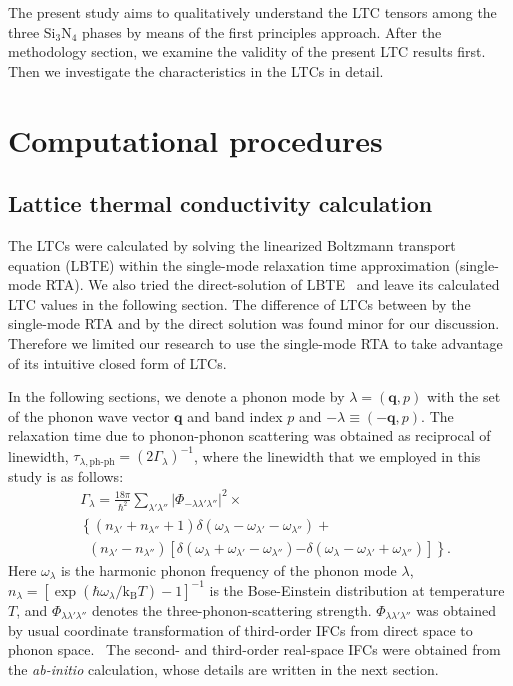 \documentclass[twocolumn,amsmath,amssymb,a4paper,prb,superscriptaddress,floatfix]{revtex4-1}
\begin{document}
The present study aims to qualitatively understand the LTC tensors among the
three Si$_3$N$_4$ phases by means of the first principles approach.  After the
methodology section, we examine the validity of the present LTC results first.
Then we investigate the characteristics in the LTCs in detail.

\section{Computational procedures}

\subsection{Lattice thermal conductivity calculation}

The LTCs were calculated by solving the linearized Boltzmann transport equation
(LBTE) within the single-mode relaxation time approximation (single-mode RTA).
We also tried the direct-solution of LBTE~\cite{chaput-direct} and
leave its calculated LTC values in the following section. The
difference of LTCs between by the single-mode RTA and by the direct solution
was found minor for our discussion. Therefore we limited our research to use
the single-mode RTA to take advantage of its intuitive closed form of LTCs.

In the following sections, we denote a phonon mode by $\lambda=(\mathbf{q},p)$
with the set of the phonon wave vector $\mathbf{q}$ and band index $p$ and $-\lambda \equiv (-\mathbf{q},p)$. The
relaxation time due to phonon-phonon scattering was obtained as reciprocal of
linewidth, $\tau_{\lambda,\text{ph-ph}}=(2\Gamma_\lambda)^{-1}$, where the
linewidth that we employed in this study is as follows:
\begin{align}
 \label{eq:linewidth}
 &\Gamma_\lambda = \frac{18\pi}{\hbar^2}
  \sum_{\lambda' \lambda''}
  \bigl|\Phi_{-\lambda\lambda'\lambda''}\bigl|^2 \times \nonumber \\ 
 &\left\{ (n_{\lambda'} + n_{\lambda''}+1) 
   \delta(\omega_\lambda-\omega_{\lambda'}-\omega_{\lambda''}) \right.
   + \nonumber \\ 
 &\;\;(n_{\lambda'}-n_{\lambda''})
  \left[\delta(\omega_\lambda +\omega_{\lambda'}-\omega_{\lambda''})
 \right. 
 \left. -\left. \delta(\omega_\lambda - \omega_{\lambda'}+\omega_{\lambda''})
 \right]\right\}.
\end{align}
Here $\omega_\lambda$ is the harmonic phonon frequency of the phonon mode
$\lambda$, $n_\lambda=[\exp(\hbar\omega_\lambda/\mathrm{k_B}T)-1]^{-1}$ is
the Bose-Einstein distribution at temperature $T$, and
$\Phi_{\lambda\lambda'\lambda''}$ denotes the three-phonon-scattering strength.
$\Phi_{\lambda\lambda'\lambda''}$ was obtained by usual coordinate
transformation of third-order IFCs from direct space to phonon
space.~\cite{phono3py} The second- and third-order real-space IFCs
were obtained from the {\it ab-initio} calculation, whose details are written in the
next section.
\end{document}
